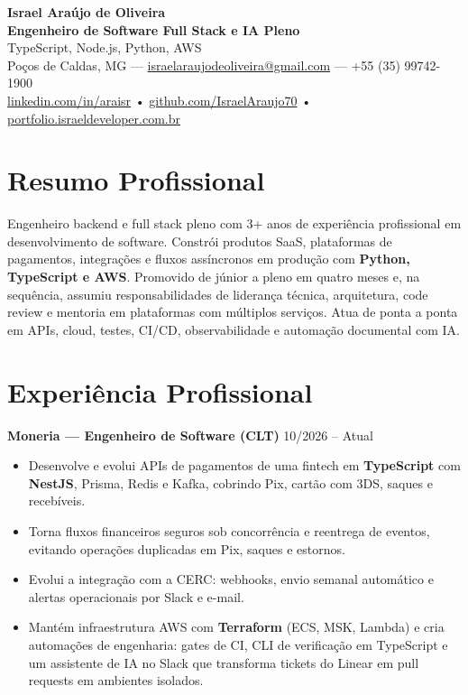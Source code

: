 \documentclass[a4paper,10pt]{article}
\begin{document}
\raggedright

\begin{center}
    {\LARGE \textbf{Israel Araújo de Oliveira}}\\[3pt]
    \textbf{Engenheiro de Software Full Stack e IA Pleno}\\[1pt]
    TypeScript, Node.js, Python, AWS\\[3pt]
    Poços de Caldas, MG —
    \href{mailto:israelaraujodeoliveira@gmail.com}{israelaraujodeoliveira@gmail.com} —
    +55 (35) 99742-1900\\
    \href{https://www.linkedin.com/in/araisr/}{linkedin.com/in/araisr} •
    \href{https://github.com/IsraelAraujo70}{github.com/IsraelAraujo70} •
    \href{https://portfolio.israeldeveloper.com.br/}{portfolio.israeldeveloper.com.br}
\end{center}

\section*{Resumo Profissional}
Engenheiro backend e full stack pleno com 3+ anos de experiência profissional em desenvolvimento de software. Constrói produtos SaaS, plataformas de pagamentos, integrações e fluxos assíncronos em produção com \textbf{Python, TypeScript e AWS}. Promovido de júnior a pleno em quatro meses e, na sequência, assumiu responsabilidades de liderança técnica, arquitetura, code review e mentoria em plataformas com múltiplos serviços. Atua de ponta a ponta em APIs, cloud, testes, CI/CD, observabilidade e automação documental com IA.

\section*{Experiência Profissional}

\textbf{Moneria — Engenheiro de Software (CLT)} \hfill 10/2026 -- Atual
\begin{itemize}[leftmargin=*, itemsep=1pt]
    \item Desenvolve e evolui APIs de pagamentos de uma fintech em \textbf{TypeScript} com \textbf{NestJS}, Prisma, Redis e Kafka, cobrindo Pix, cartão com 3DS, saques e recebíveis.
    \item Torna fluxos financeiros seguros sob concorrência e reentrega de eventos, evitando operações duplicadas em Pix, saques e estornos.
    \item Evolui a integração com a CERC: webhooks, envio semanal automático e alertas operacionais por Slack e e-mail.
    \item Mantém infraestrutura AWS com \textbf{Terraform} (ECS, MSK, Lambda) e cria automações de engenharia: gates de CI, CLI de verificação em TypeScript e um assistente de IA no Slack que transforma tickets do Linear em pull requests em ambientes isolados.
\end{itemize}
\end{document}
